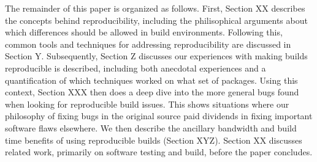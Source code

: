 The remainder of this paper is organized as follows.  First, Section XX
describes the concepts behind reproducibility, including the philisophical
arguments about which differences should be allowed in build environments.
Following this, common tools and techniques for addressing reproducibility
are discussed in Section Y.  Subsequently, Section Z discusses our 
experiences with making builds reproducible is described, including both 
anecdotal experiences and a quantification of which techniques worked on 
what set of packages.  Using this context, Section XXX then does a deep
dive into the more general bugs found when looking for reproducible
build issues.  This shows situations where our philosophy of fixing bugs in
the original source paid dividends in fixing important software flaws
elsewhere.  We then describe the ancillary bandwidth and build time
benefits of using reproducible builds (Section XYZ).
Section XX discusses
related work, primarily on software testing and build, before the paper
concludes.

